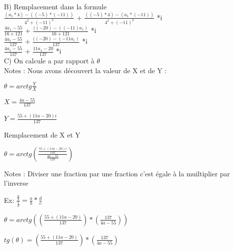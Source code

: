 \vspace{5mm} %

B) Remplacement dans la formule \\

$\frac{(a_1 * 4) - ((-5)*(-11))} {4^{2}+(-11)^{2} } $ + $\frac{( (-5) * 4) - (a_1*(-11))} {4^{2}+(-11)^{2} } $ *i \\

$\frac{4a_1 -55} {16+121} $ + $\frac{( (-20) - ((-11)a_1)} {16+121} $ *i \\

$\frac{4a_1 -55} {137} $ + $\frac{( (-20) - (-11a_1)} {137} $ *i \\

$\frac{4a_1 -55} {137} $ + $\frac{11a_1-20} {137} $ *i \\

\vspace{8mm} %
C) On calcule a par rapport à $\theta$ \\

Notes : Nous avons découvert la valeur de X et de Y : \\
\vspace{3mm} %

$\theta = arctg{\frac{Y}{X}}$
\vspace{5mm} %

$X = \frac{4a-55}{137}$
\vspace{5mm} %

$Y= \frac{55+(11a-20)i}{137}$
\vspace{5mm} %

Remplacement de X et Y
\vspace{5mm} %

$\theta = arctg(\frac{\frac{55+(11a-20)i}{137}} {\frac{4a-55}{137}})$
\vspace{5mm} %

Notes : Diviser une fraction par une fraction c'est égale à la muiltiplier par l'inverse
\vspace{5mm} %

Ex:
$\frac{\frac{a}{b}}{\frac{c}{d}} = \frac{a}{b} * \frac{d}{c}$
\vspace{5mm} %

$\theta = arctg((\frac{55+(11a-20)}{137}) * (\frac{137}{4a-55}))$
\vspace{5mm} %

$tg(\theta) = (\frac{55+(11a-20)}{137}) * (\frac{137}{4a-55})$
\vspace{5mm} %

